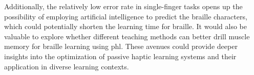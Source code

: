 Additionally, the relatively low error rate in single-finger tasks opens up the possibility of employing artificial intelligence to predict the braille characters, which could potentially shorten the learning time for braille. It would also be valuable to explore whether different teaching methods can better drill muscle memory for braille learning using \gls{phl}. These avenues could provide deeper insights into the optimization of passive haptic learning systems and their application in diverse learning contexts.

